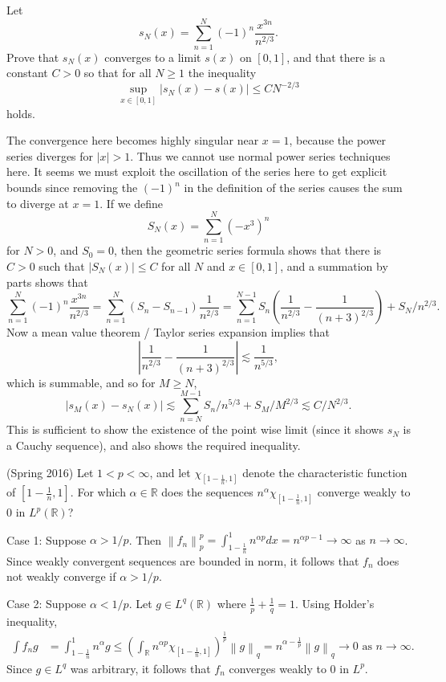 \documentclass{exam}
\theoremstyle{problemstyle}
\newcommand{\norm}[1]{\left\lVert#1\right\rVert} %
\newcommand{\1}[1]{\textbf{1}_{\left[#1\right]}} %
\def\R{\mathbb{R}} %
\begin{document}
\begin{questions}
\question Let
%
\[ s_N(x) = \sum_{n = 1}^N (-1)^n \frac{x^{3n}}{n^{2/3}}. \]
%
Prove that $s_N(x)$ converges to a limit $s(x)$ on $[0,1]$, and that there is a constant $C > 0$ so that for all $N \geq 1$ the inequality
%
\[ \sup_{x \in [0,1]} |s_N(x) - s(x)|\leq C N^{-2/3} \]
%
holds.
\begin{solution}
    The convergence here becomes highly singular near $x = 1$, because the power series diverges for $|x| > 1$. Thus we cannot use normal power series techniques here. It seems we must exploit the oscillation of the series here to get explicit bounds since removing the $(-1)^n$ in the definition of the series causes the sum to diverge at $x = 1$. If we define
    \[ S_N(x) = \sum_{n = 1}^N (-x^3)^n \]
    for $N > 0$, and $S_0 = 0$, then the geometric series formula shows that there is $C > 0$ such that $|S_N(x)| \leq C$ for all $N$ and $x \in [0,1]$, and a summation by parts shows that
    \[ \sum_{n = 1}^N (-1)^n \frac{x^{3n}}{n^{2/3}} = \sum_{n = 1}^N (S_n - S_{n-1}) \frac{1}{n^{2/3}} = \sum_{n = 1}^{N-1} S_n \left( \frac{1}{n^{2/3}} - \frac{1}{(n+3)^{2/3}} \right) + S_N / n^{2/3}. \]
    Now a mean value theorem / Taylor series expansion implies that
    \[ \left| \frac{1}{n^{2/3}} - \frac{1}{(n+3)^{2/3}} \right| \lesssim \frac{1}{n^{5/3}}, \]
    which is summable, and so for $M \geq N$,
    \[ |s_M(x) - s_N(x)| \lesssim \sum_{n = N}^{M-1} S_n / n^{5/3} + S_M / M^{2/3} \lesssim C/N^{2/3}. \]
    This is sufficient to show the existence of the point wise limit (since it shows $s_N$ is a Cauchy sequence), and also shows the required inequality.
\end{solution}


\item (Spring 2016) Let $1<p<\infty$, and let $\chi_{[1-\frac{1}{n},1]}$ denote the characteristic function of $[1-\frac{1}{n},1]$. For which $\alpha\in \R$ does the sequences $n^{\alpha}\chi_{[1-\frac{1}{n},1]}$ converge weakly to $0$ in $L^{p}(\R)$?

\begin{solution}
  Case 1: Suppose $\alpha> 1/p$. Then $\norm{f_{n}}_{p}^{p} = \int_{1-\frac{1}{n}}^{1}n^{\alpha p}dx = n^{\alpha p - 1}\to \infty$ as $n\to\infty$. Since weakly convergent sequences are bounded in norm, it follows that $f_{n}$ does not weakly converge if $\alpha>1/p$.

  Case 2: Suppose $\alpha<1/p$. Let $g\in L^{q}(\R)$ where $\frac{1}{p}+\frac{1}{q}=1$. Using Holder's inequality,
  \begin{align*}
    \int f_{n}g &= \int_{1-\frac{1}{n}}^{1}n^{\alpha} g \leq \left( \int_{\R}n^{\alpha p}\chi_{[1-\frac{1}{n},1]} \right)^{\frac{1}{p}} \norm{g}_{q} = n^{\alpha-\frac{1}{p}}\norm{g}_{q}\to 0 \text{ as }n\to\infty.
  \end{align*}
  Since $g\in L^{q}$ was arbitrary, it follows that $f_{n}$ converges weakly to $0$ in $L^{p}$.


\end{solution}
\end{questions}
\end{document}
